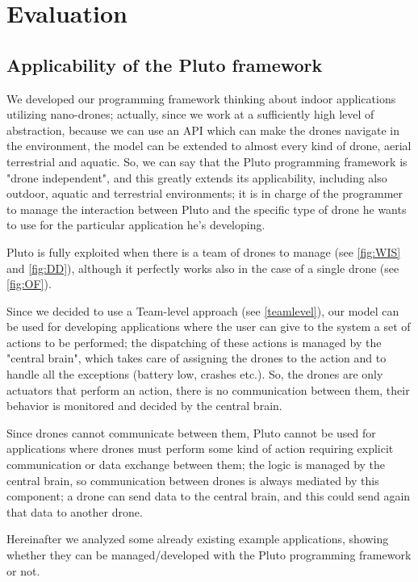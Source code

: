 \chapter{Evaluation}
\label{cap6}


\section{Applicability of the Pluto framework}\label{applicability}


We developed our programming framework thinking about indoor applications utilizing nano-drones; actually, since we work at a sufficiently high level of abstraction, because we can use an API which can make the drones navigate in the environment, the model can be extended to almost every kind of drone, aerial terrestrial and aquatic.
So, we can say that the Pluto programming framework is "drone independent", and this greatly extends its applicability, including also outdoor, aquatic and terrestrial environments; it is in charge of the programmer to manage the interaction between Pluto and the specific type of drone he wants to use for the particular application he's developing.

Pluto is fully exploited when there is a team of drones to manage (see \ref{fig:WIS} and \ref{fig:DD}), although it perfectly works also in the case of a single drone (see \ref{fig:OF}).

Since we decided to use a Team-level approach (see \ref{teamlevel}), our model can be used for developing applications where the user can give to the system a set of actions to be performed; the dispatching of these actions is managed by the "central brain", which takes care of assigning the drones to the action and to handle all the exceptions (battery low, crashes etc.). So, the drones are only actuators that perform an action, there is no communication between them, their behavior is monitored and decided by the central brain.

Since drones cannot communicate between them, Pluto cannot be used for applications where drones must perform some kind of action requiring explicit communication or data exchange between them; the logic is managed by the central brain, so communication between drones is always mediated by this component; a drone can send data to the central brain, and this could send again that data to another drone.

Hereinafter we analyzed some already existing example applications, showing whether they can be managed/developed with the Pluto programming framework or not.

